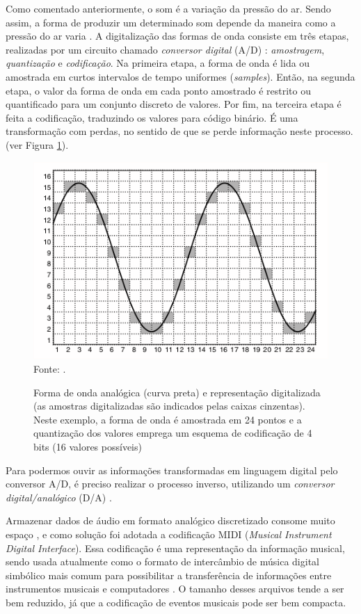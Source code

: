 Como comentado anteriormente, o som é a variação da pressão do ar. Sendo assim, a forma de produzir um determinado som depende da maneira como a pressão do ar varia \cite{miletto2004}. A digitalização das formas de onda consiste em três etapas, realizadas por um circuito chamado \textit{conversor digital} (A/D) \cite{paulozuben2004}: \textit{amostragem}, \textit{quantização} e \textit{codificação}. Na primeira etapa, a forma de onda é lida ou amostrada em curtos intervalos de tempo uniformes (\textit{samples}). Então, na segunda etapa, o valor da forma de onda em cada ponto amostrado é restrito ou quantificado para um conjunto discreto de valores. Por fim, na terceira etapa é feita a codificação, traduzindo os valores para código binário. É uma transformação com perdas, no sentido de que se perde informação neste processo. (ver Figura \ref{fig:ondaAnalog}).

\begin{figure}[!htb]
   \centering
   \caption{Forma de onda analógica (curva preta) e representação digitalizada (as amostras digitalizadas são indicados pelas caixas cinzentas). Neste exemplo, a forma de onda é amostrada em 24 pontos e a quantização dos valores emprega um esquema de codificação de 4 bits (16 valores possíveis)}\label{fig:ondaAnalog} 
   \includegraphics[scale=0.8]{figuras/ondaAnalog.png}
   \\Fonte: \cite{muller2007}.
\end{figure}

Para podermos ouvir as informações transformadas em linguagem digital pelo conversor A/D, é preciso realizar o processo inverso, utilizando um \textit{conversor digital/analógico} (D/A) \cite{paulozuben2004}.

Armazenar dados de áudio em formato analógico discretizado consome muito espaço \cite{juliana2004}, e como solução foi adotada a codificação MIDI (\textit{Musical Instrument Digital Interface}). Essa codificação é uma representação da informação musical, sendo usada atualmente como o formato de intercâmbio de música digital simbólico mais comum para possibilitar a transferência de informações entre instrumentos musicais e computadores \cite{muller2007}. O tamanho desses arquivos tende a ser bem reduzido, já que a codificação de eventos musicais pode ser bem compacta.

